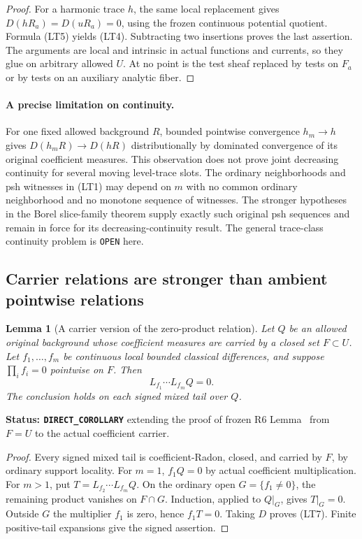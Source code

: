 \documentclass[11pt,a4paper]{article}
\numberwithin{equation}{section}
\newtheorem{lemma}[theorem]{Lemma}
\theoremstyle{definition}
\theoremstyle{remark}
\begin{document}
\begin{proof}
For a harmonic trace $h$, the same local replacement gives
$D(hR_a)=D(uR_a)=0$, using the frozen continuous potential quotient.
Formula (LT5) yields (LT4). Subtracting two insertions proves the
last assertion. The arguments are local and intrinsic in actual
functions and currents, so they glue on arbitrary allowed $U$.
At no point is the test sheaf replaced by tests on $F_a$ or by
tests on an auxiliary analytic fiber.
\end{proof}

\paragraph{A precise limitation on continuity.}
For one fixed allowed background $R$, bounded pointwise convergence
$h_m\to h$ gives $D(h_mR)\to D(hR)$ distributionally by dominated
convergence of its original coefficient measures. This observation
does not prove joint decreasing continuity for several moving
level-trace slots. The ordinary neighborhoods and psh witnesses in
(LT1) may depend on $m$ with no common ordinary neighborhood and
no monotone sequence of witnesses. The stronger hypotheses in the
Borel slice-family theorem supply exactly such original psh
sequences and remain in force for its decreasing-continuity result.
The general trace-class continuity problem is \texttt{OPEN} here.

\subsection{Carrier relations are stronger than ambient pointwise relations}

\begin{lemma}[A carrier version of the zero-product relation]
\label{lem:r12-carrier-zero-product}
Let $Q$ be an allowed original background whose coefficient measures
are carried by a closed set $F\subset U$. Let $f_1,\ldots,f_m$ be
continuous local bounded classical differences, and suppose
$\prod_i f_i=0$ pointwise on $F$. Then
\[
                        L_{f_1}\cdots L_{f_m}Q=0.                  \tag{LT7}
\]
The conclusion holds on each signed mixed tail over $Q$.
\end{lemma}

\noindent\textbf{Status: \texttt{DIRECT\_COROLLARY}} extending
the proof of frozen R6 Lemma~
from $F=U$ to the actual coefficient carrier.

\begin{proof}
Every signed mixed tail is coefficient-Radon, closed, and carried
by $F$, by ordinary support locality. For $m=1$, $f_1Q=0$ by
actual coefficient multiplication. For $m>1$, put
$T=L_{f_2}\cdots L_{f_m}Q$. On the ordinary open
$G=\{f_1\ne0\}$, the remaining product vanishes on $F\cap G$.
Induction, applied to $Q|_G$, gives $T|_G=0$. Outside $G$ the
multiplier $f_1$ is zero, hence $f_1T=0$. Taking $D$ proves (LT7).
Finite positive-tail expansions give the signed assertion.
\end{proof}
\end{document}
